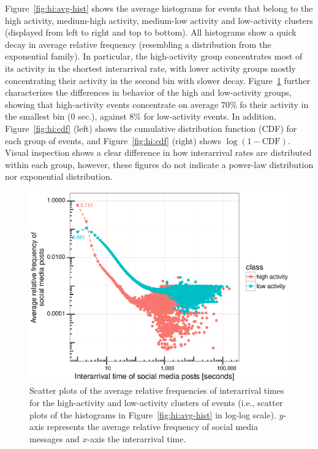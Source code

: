 Figure~\ref{fig:hi:avg-hist} shows the average histograms for events that belong
to the high activity, medium-high activity, medium-low activity and low-activity
clusters (displayed from left to right and top to bottom). 
%
All histograms show a quick decay in average relative frequency (resembling a
distribution from the exponential family). 
%
In particular, the high-activity group concentrates most of its activity in the
shortest interarrival rate, with lower activity groups mostly concentrating
their activity in the second bin with slower decay. 
%
Figure~\ref{fig:hi:scatter} further characterizes the differences in behavior of
the high and low-activity groups, showing that high-activity events concentrate
on average $70\%$ fo their activity in the smallest bin ($0$ sec.), against
$8\%$ for low-activity events. 
%
In addition, Figure~\ref{fig:hi:cdf} (left) shows the cumulative distribution
function (CDF) for each group of events, and Figure~\ref{fig:hi:cdf} (right)
shows $\log{(1 - \mathrm{CDF})}$. 
%
Visual inspection shows a clear difference in how interarrival rates are
distributed within each group, however, these figures do not indicate a
power-law distribution nor exponential distribution.%

\begin{figure}[!htb]
  \centering
    \includegraphics[width=\textwidth]{figures/high-activity/fig5}
  \caption[Relative frequencies of interarrival times]{Scatter plots of the
average relative frequencies of interarrival times for the high-activity and
low-activity clusters of events (i.e., scatter plots of the histograms in
Figure~\ref{fig:hi:avg-hist} in log-log scale). $y$-axis represents the average
relative frequency of social media messages and $x$-axis the interarrival time.}
\label{fig:hi:scatter}
\end{figure}

